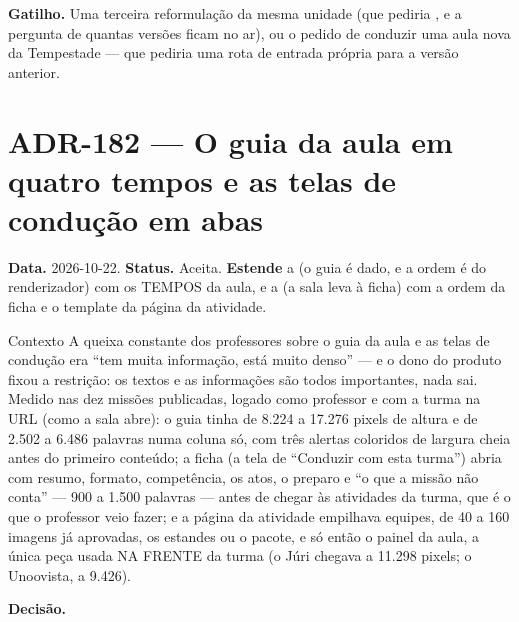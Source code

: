 \textbf{Gatilho.} Uma terceira reformulação da mesma unidade (que pediria
, e a pergunta de quantas versões ficam no ar), ou o pedido de conduzir
uma aula nova da Tempestade --- que pediria uma rota de entrada própria para a
versão anterior.

\section{ADR-182 --- O guia da aula em quatro tempos e as telas de condução em abas}
\label{adr:tempos-do-guia-e-abas-da-conducao}

\textbf{Data.} 2026-10-22. \textbf{Status.} Aceita. \textbf{Estende} a
 (o guia é dado, e a ordem é do renderizador) com os TEMPOS da
aula, e a  (a sala leva à ficha) com a ordem da ficha e o
template da página da atividade.

\begin{especificacao}{Contexto}
A queixa constante dos professores sobre o guia da aula e as telas de condução
era \enquote{tem muita informação, está muito denso} --- e o dono do produto
fixou a restrição: os textos e as informações são todos importantes, nada sai.
Medido nas dez missões publicadas, logado como professor e com a turma na URL
(como a sala abre): o guia tinha de 8.224 a 17.276 pixels de altura e de 2.502 a
6.486 palavras numa coluna só, com três alertas coloridos de largura cheia antes
do primeiro conteúdo; a ficha (a tela de \enquote{Conduzir com esta turma})
abria com resumo, formato, competência, os atos, o preparo e \enquote{o que a
missão não conta} --- 900 a 1.500 palavras --- antes de chegar às atividades da
turma, que é o que o professor veio fazer; e a página da atividade empilhava
equipes, de 40 a 160 imagens já aprovadas, os estandes ou o pacote, e só então o
painel da aula, a única peça usada NA FRENTE da turma (o Júri chegava a 11.298
pixels; o Unoovista, a 9.426).
\end{especificacao}

\textbf{Decisão.}

